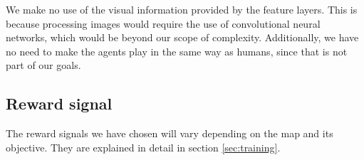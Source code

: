 We make no use of the visual information provided by the feature layers. This is because processing images would require the use of convolutional neural networks, which would be beyond our scope of complexity. Additionally, we have no need to make the agents play in the same way as humans, since that is not part of our goals.

\subsection{Reward signal}

The reward signals we have chosen will vary depending on the map and its objective. They are explained in detail in section \ref{sec:training}.